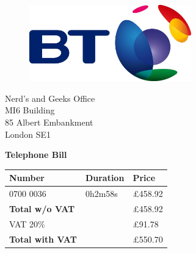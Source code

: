 \documentclass[11pt,a4paper]{article}
\begin{document}
\newpage

\begin{figure}[!h]
\includegraphics[width=7cm]{bt.jpg}
\end{figure}

\raggedleft
Nerd's and Geeks Office\\
MI6 Building\\
85 Albert Embankment\\
London SE1\\

\raggedright
\vspace{1cm}
\Huge{\textbf{Telephone Bill}}

\vspace{1cm}

\normalsize

\begin{tabularx}{\textwidth}{X X X}
  Number & Duration & Price \\
  \hline
  0700 0036 & 0h2m58s & \pounds458.92 \\
  \hline
  \textbf{Total w/o VAT} &  & \pounds458.92 \\
  \hline
  VAT 20\% & & \pounds91.78 \\
  \hline
  \textbf{Total with VAT} & & \pounds550.70 \\
\end{tabularx}
\end{document}
